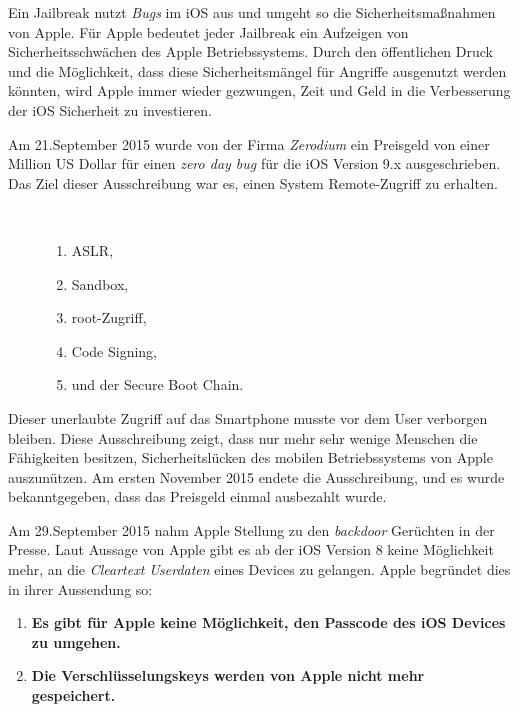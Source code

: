 Ein Jailbreak nutzt \textit{\glqq Bugs\grqq{}} im iOS aus und umgeht so die Sicherheitsmaßnahmen von Apple. Für Apple bedeutet jeder Jailbreak ein Aufzeigen von Sicherheitsschwächen des Apple Betriebssystems. Durch den öffentlichen Druck und die Möglichkeit, dass diese Sicherheitsmängel für Angriffe ausgenutzt werden könnten, wird Apple immer wieder gezwungen, Zeit und Geld in die Verbesserung der iOS Sicherheit zu investieren. 

Am 21.September 2015 wurde von der Firma \textit{\glqq Zerodium\grqq{}} ein Preisgeld von einer Million US Dollar für einen \textit{\glqq zero day bug\grqq{}} für die iOS Version 9.x ausgeschrieben. Das Ziel dieser Ausschreibung war es, einen System Remote-Zugriff zu erhalten. 
\begin{description}
    \item[\parbox{\textwidth} {Folgende iOS Sicherheitsmechanismen mussten durch diesen Jailbreak umgangen werden}]~\par
    \begin{enumerate}
        \item ASLR, 
        \item Sandbox,
        \item root-Zugriff, 
        \item Code Signing, 
        \item und der Secure Boot Chain.
    \end{enumerate}
\end{description} 

Dieser unerlaubte Zugriff auf das Smartphone musste vor dem User verborgen bleiben. Diese Ausschreibung zeigt, dass nur mehr sehr wenige Menschen die Fähigkeiten besitzen, Sicherheitslücken des mobilen Betriebssystems von Apple auszunützen. Am ersten November 2015 endete die Ausschreibung, und es wurde bekanntgegeben, dass das Preisgeld einmal ausbezahlt wurde. 

Am 29.September 2015 nahm Apple Stellung  zu den \textit{\glqq backdoor\grqq{}} Gerüchten in der Presse. Laut Aussage von Apple gibt es ab der iOS Version 8 keine Möglichkeit mehr, an die \textit{\glqq Cleartext Userdaten\grqq{}} eines Devices zu gelangen. Apple begründet dies in ihrer Aussendung so:
\begin{enumerate}
    \item \textbf{Es gibt für Apple keine Möglichkeit, den Passcode des iOS Devices zu umgehen.}
    \item \textbf{Die Verschlüsselungskeys werden von Apple nicht mehr gespeichert.}
\end{enumerate}

